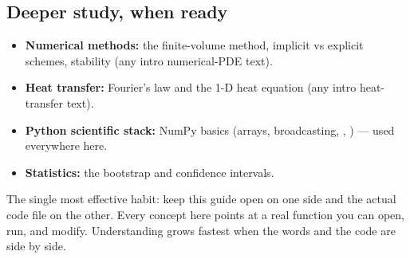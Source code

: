 \subsection*{Deeper study, when ready}
\begin{itemize}[leftmargin=1.4em,itemsep=3pt]
  \item \textbf{Numerical methods:} the finite-volume method, implicit vs
    explicit schemes, stability (any intro numerical-PDE text).
  \item \textbf{Heat transfer:} Fourier's law and the 1-D heat equation (any
    intro heat-transfer text).
  \item \textbf{Python scientific stack:} NumPy basics (arrays, broadcasting,
    , ) --- used everywhere here.
  \item \textbf{Statistics:} the bootstrap and confidence intervals.
\end{itemize}

\begin{keyidea}
The single most effective habit: keep this guide open on one side and the actual
code file on the other. Every concept here points at a real function you can
open, run, and modify. Understanding grows fastest when the words and the code
are side by side.
\end{keyidea}
